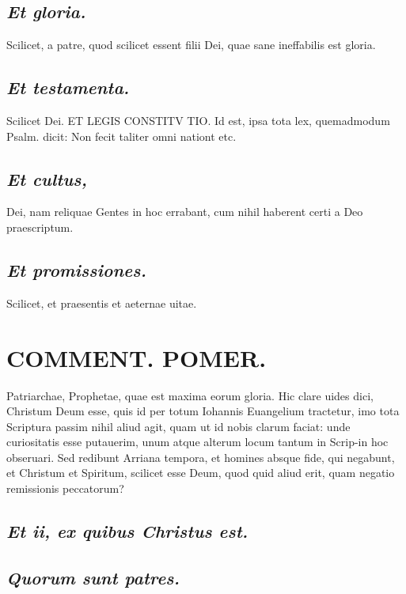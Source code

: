 \documentclass{article}
\begin{document}
\begin{pages}
\subsection*{\textit{Et gloria. }}\pstart Scilicet, a patre, quod scilicet essent filii Dei, quae sane ineffabilis est gloria.   \pend
{}
{}
\subsection*{\textit{Et testamenta. }}\pstart Scilicet Dei. ET LEGIS CONSTITV TIO. Id est, ipsa tota lex, quemadmodum Psalm.  dicit: Non fecit taliter omni nationt etc.   \pend
{}
{}
\subsection*{\textit{Et cultus, }}\pstart Dei, nam reliquae Gentes in hoc errabant, cum nihil haberent certi a Deo praescriptum.   \pend
{}
{}
\subsection*{\textit{Et promissiones. }}\pstart Scilicet, et praesentis et aeternae uitae.   \pend
\section*{COMMENT. POMER.  }\pstart Patriarchae, Prophetae, quae est maxima eorum gloria.   \pend\pstart Hic clare uides dici, Christum Deum esse, quis id per totum Iohannis Euangelium tractetur, imo tota Scriptura passim nihil aliud agit, quam ut id nobis clarum faciat: unde curiositatis esse putauerim, unum atque alterum locum tantum in Scrip-in hoc obseruari. Sed redibunt Arriana tempora, et homines absque  fide, qui negabunt, et Christum et Spiritum, scilicet esse Deum, quod quid aliud erit, quam negatio remissionis peccatorum?  \pend
{}
{}
\subsection*{\textit{Et ii, ex quibus Christus est. }}
{}
\subsection*{\textit{Quorum sunt patres. }}
{}

\end{pages}
\end{document}
